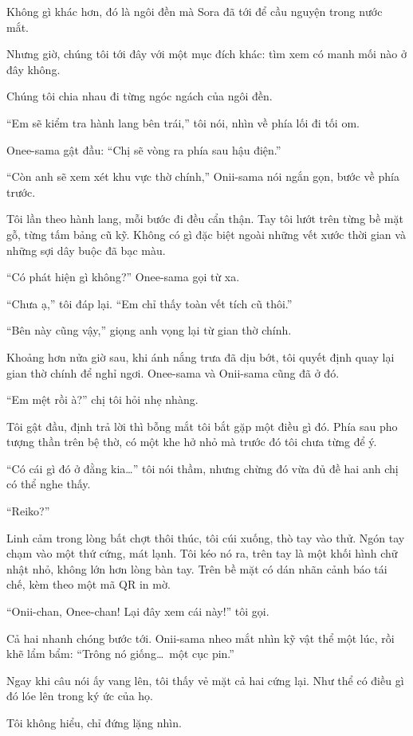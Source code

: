 \documentclass[../main.tex]{subfiles}
\begin{document}
Không gì khác hơn, đó là ngôi đền mà Sora đã tới để cầu nguyện trong nước mắt.

Nhưng giờ, chúng tôi tới đây với một mục đích khác: tìm xem có manh mối nào ở đây không.

Chúng tôi chia nhau đi từng ngóc ngách của ngôi đền.

``Em sẽ kiểm tra hành lang bên trái,'' tôi nói, nhìn về phía lối đi tối om.

Onee-sama gật đầu: ``Chị sẽ vòng ra phía sau hậu điện.''

``Còn anh sẽ xem xét khu vực thờ chính,'' Onii-sama nói ngắn gọn, bước về phía trước.

Tôi lần theo hành lang, mỗi bước đi đều cẩn thận. Tay tôi lướt trên từng bề mặt gỗ, từng tấm bảng cũ kỹ. Không có gì đặc biệt ngoài những vết xước thời gian và những sợi dây buộc đã bạc màu.

``Có phát hiện gì không?'' Onee-sama gọi từ xa.

``Chưa ạ,'' tôi đáp lại. ``Em chỉ thấy toàn vết tích cũ thôi.''

``Bên này cũng vậy,'' giọng anh vọng lại từ gian thờ chính.

Khoảng hơn nửa giờ sau, khi ánh nắng trưa đã dịu bớt, tôi quyết định quay lại gian thờ chính để nghỉ ngơi. Onee-sama và Onii-sama cũng đã ở đó.

``Em mệt rồi à?'' chị tôi hỏi nhẹ nhàng.

Tôi gật đầu, định trả lời thì bỗng mắt tôi bắt gặp một điều gì đó. Phía sau pho tượng thần trên bệ thờ, có một khe hở nhỏ mà trước đó tôi chưa từng để ý.

``Có cái gì đó ở đằng kia\dots'' tôi nói thầm, nhưng chừng đó vừa đủ đề hai anh chị có thể nghe thấy.

``Reiko?''

Linh cảm trong lòng bất chợt thôi thúc, tôi cúi xuống, thò tay vào thử. Ngón tay chạm vào một thứ cứng, mát lạnh. Tôi kéo nó ra, trên tay là một khối hình chữ nhật nhỏ, không lớn hơn lòng bàn tay. Trên bề mặt có dán nhãn cảnh báo tái chế, kèm theo một mã QR in mờ.

``Onii-chan, Onee-chan! Lại đây xem cái này!'' tôi gọi.

Cả hai nhanh chóng bước tới. Onii-sama nheo mắt nhìn kỹ vật thể một lúc, rồi khẽ lẩm bẩm: ``Trông nó giống\dots\ một cục pin.''

Ngay khi câu nói ấy vang lên, tôi thấy vẻ mặt cả hai cứng lại. Như thể có điều gì đó lóe lên trong ký ức của họ.

Tôi không hiểu, chỉ đứng lặng nhìn.
\end{document}
